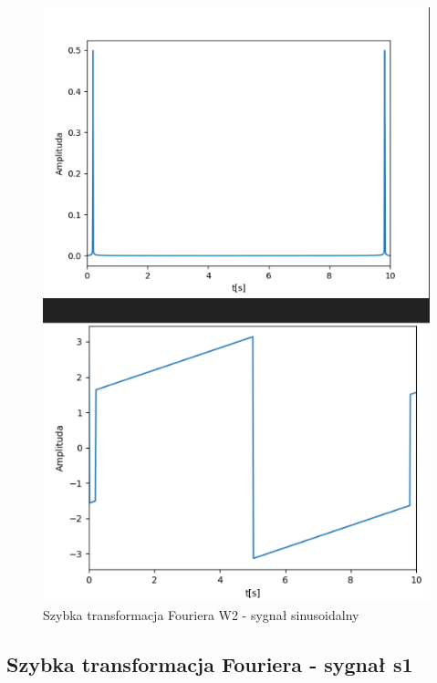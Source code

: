 \documentclass[12pt]{article}
\begin{document}
\begin{figure}[H]
\centering
\includegraphics[scale=0.6]{sinusFastW2.png}
\caption{Szybka transformacja Fouriera W2 - sygnał sinusoidalny}
\end{figure}

\subsection{Szybka transformacja Fouriera - sygnał s1}
\end{document}
